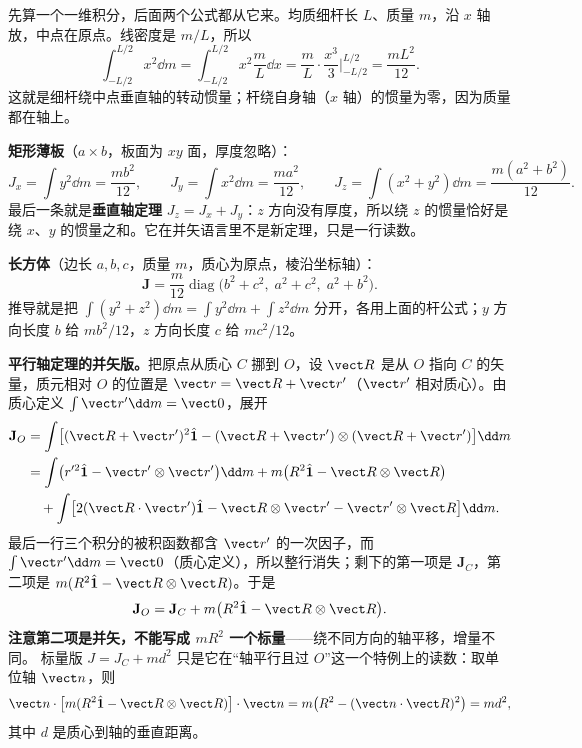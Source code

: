 \documentclass[11pt]{ctexart}
\newcommand{\ten}[1]{\mathbf{#1}}
\newcommand{\unitd}{\hat{\ten{1}}}
\let\origsubhdr\subhdr
\renewcommand{\subhdr}[1]{\par\needspace{3\baselineskip}\origsubhdr{#1}}
\begin{document}

先算一个一维积分，后面两个公式都从它来。均质细杆长 $L$、质量 $m$，沿 $x$ 轴放，中点在原点。线密度是 $m/L$，所以
\[
\int_{-L/2}^{L/2}x^2\dd m
=\int_{-L/2}^{L/2}x^2\frac{m}{L}\dd x
=\frac{m}{L}\cdot\frac{x^3}{3}\Big|_{-L/2}^{L/2}
=\frac{mL^2}{12}.
\]
这就是细杆绕中点垂直轴的转动惯量；杆绕自身轴（$x$ 轴）的惯量为零，因为质量都在轴上。

\textbf{矩形薄板}（$a\times b$，板面为 $xy$ 面，厚度忽略）：
\[
J_x=\int y^2\dd m=\frac{mb^2}{12},\qquad
J_y=\int x^2\dd m=\frac{ma^2}{12},\qquad
J_z=\int(x^2+y^2)\dd m=\frac{m(a^2+b^2)}{12}.
\]
最后一条就是\textbf{垂直轴定理} $J_z=J_x+J_y$：$z$ 方向没有厚度，所以绕 $z$ 的惯量恰好是绕 $x$、$y$ 的惯量之和。它在并矢语言里不是新定理，只是一行读数。

\textbf{长方体}（边长 $a,b,c$，质量 $m$，质心为原点，棱沿坐标轴）：
\[
\ten J=\frac{m}{12}\operatorname{diag}\bigl(b^2+c^2,\;a^2+c^2,\;a^2+b^2\bigr).
\]
推导就是把 $\int(y^2+z^2)\dd m=\int y^2\dd m+\int z^2\dd m$ 分开，各用上面的杆公式；$y$ 方向长度 $b$ 给 $mb^2/12$，$z$ 方向长度 $c$ 给 $mc^2/12$。

\textbf{平行轴定理的并矢版。}把原点从质心 $C$ 挪到 $O$，设 $\vect R$ 是从 $O$ 指向 $C$ 的矢量，质元相对 $O$ 的位置是 $\vect r=\vect R+\vect r'$（$\vect r'$ 相对质心）。由质心定义 $\int\vect r'\dd m=\vect0$，展开
\[
\begin{aligned}
\ten J_O&=\int\bigl[(\vect R+\vect r')^2\unitd-(\vect R+\vect r')\otimes(\vect R+\vect r')\bigr]\dd m\\
&=\int\bigl(r'^2\unitd-\vect r'\otimes\vect r'\bigr)\dd m
+m\bigl(R^2\unitd-\vect R\otimes\vect R\bigr)\\
&\quad+\int\bigl[2(\vect R\cdot\vect r')\unitd-\vect R\otimes\vect r'-\vect r'\otimes\vect R\bigr]\dd m .
\end{aligned}
\]
最后一行三个积分的被积函数都含 $\vect r'$ 的一次因子，而 $\int\vect r'\dd m=\vect0$（质心定义），所以整行消失；剩下的第一项是 $\ten J_C$，第二项是 $m(R^2\unitd-\vect R\otimes\vect R)$。于是
\[
\ten J_O=\ten J_C+m\bigl(R^2\unitd-\vect R\otimes\vect R\bigr).
\]
\textbf{注意第二项是并矢，不能写成 $mR^2$ 一个标量}——绕不同方向的轴平移，增量不同。
标量版 $J=J_C+md^2$ 只是它在“轴平行且过 $O$”这一个特例上的读数：取单位轴 $\vect n$，则
\[
\vect n\cdot\bigl[m(R^2\unitd-\vect R\otimes\vect R)\bigr]\cdot\vect n
=m\bigl(R^2-(\vect n\cdot\vect R)^2\bigr)=m d^2,
\]
其中 $d$ 是质心到轴的垂直距离。
\end{document}

